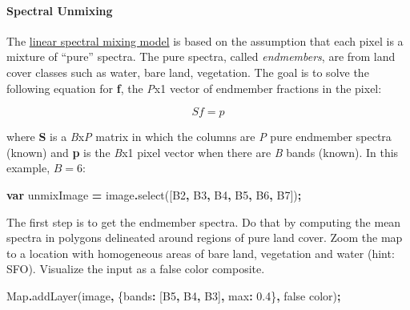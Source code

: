 \documentclass[
]{article}
\newenvironment{Shaded}{\begin{snugshade}}{\end{snugshade}}
\newcommand{\BuiltInTok}[1]{#1}
\newcommand{\DataTypeTok}[1]{\textcolor[rgb]{0.13,0.29,0.53}{#1}}
\newcommand{\FloatTok}[1]{\textcolor[rgb]{0.00,0.00,0.81}{#1}}
\newcommand{\FunctionTok}[1]{\textcolor[rgb]{0.00,0.00,0.00}{#1}}
\newcommand{\KeywordTok}[1]{\textcolor[rgb]{0.13,0.29,0.53}{\textbf{#1}}}
\newcommand{\NormalTok}[1]{#1}
\newcommand{\OperatorTok}[1]{\textcolor[rgb]{0.81,0.36,0.00}{\textbf{#1}}}
\newcommand{\StringTok}[1]{\textcolor[rgb]{0.31,0.60,0.02}{#1}}
\begin{document}
\hypertarget{spectral-unmixing}{%
\paragraph{Spectral Unmixing}\label{spectral-unmixing}}

The \href{http://ieeexplore.ieee.org/xpls/abs_all.jsp?arnumber=974727\&tag=1}{linear spectral mixing model} is based on the assumption that each pixel is a mixture of ``pure'' spectra. The pure spectra, called \emph{endmembers}, are from land cover classes such as water, bare land, vegetation. The goal is to solve the following equation for \textbf{f}, the \emph{P}x1 vector of endmember fractions in the pixel:

\[ Sf = p \]

where \textbf{S} is a \emph{B}x\emph{P} matrix in which the columns are \emph{P} pure endmember spectra (known) and \textbf{p} is the \emph{B}x1 pixel vector when there are \emph{B} bands (known). In this example, \(B= 6\):

\begin{Shaded}
\begin{Highlighting}[]
\KeywordTok{var}\NormalTok{ unmixImage }\OperatorTok{=}\NormalTok{ image}\OperatorTok{.}\FunctionTok{select}\NormalTok{([}\StringTok{\textquotesingle{}B2\textquotesingle{}}\OperatorTok{,} \StringTok{\textquotesingle{}B3\textquotesingle{}}\OperatorTok{,} \StringTok{\textquotesingle{}B4\textquotesingle{}}\OperatorTok{,} \StringTok{\textquotesingle{}B5\textquotesingle{}}\OperatorTok{,} \StringTok{\textquotesingle{}B6\textquotesingle{}}\OperatorTok{,} \StringTok{\textquotesingle{}B7\textquotesingle{}}\NormalTok{])}\OperatorTok{;}  
\end{Highlighting}
\end{Shaded}

The first step is to get the endmember spectra. Do that by computing the mean spectra in polygons delineated around regions of pure land cover. Zoom the map to a location with homogeneous areas of bare land, vegetation and water (hint: SFO). Visualize the input as a false color composite.

\begin{Shaded}
\begin{Highlighting}[]
\BuiltInTok{Map}\OperatorTok{.}\FunctionTok{addLayer}\NormalTok{(image}\OperatorTok{,}\NormalTok{ \{}\DataTypeTok{bands}\OperatorTok{:}\NormalTok{ [}\StringTok{\textquotesingle{}B5\textquotesingle{}}\OperatorTok{,} \StringTok{\textquotesingle{}B4\textquotesingle{}}\OperatorTok{,} \StringTok{\textquotesingle{}B3\textquotesingle{}}\NormalTok{]}\OperatorTok{,} \DataTypeTok{max}\OperatorTok{:} \FloatTok{0.4}\NormalTok{\}}\OperatorTok{,} \StringTok{\textquotesingle{}false color\textquotesingle{}}\NormalTok{)}\OperatorTok{;}  
\end{Highlighting}
\end{Shaded}
\end{document}
